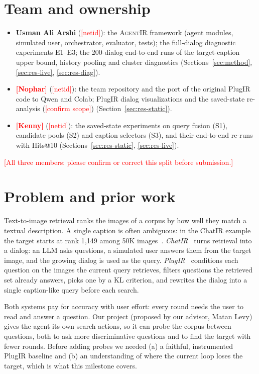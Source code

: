 \documentclass[sigconf,nonacm]{acmart}
\newcommand{\fillin}[1]{\textcolor{red}{[#1]}}
\begin{document}
\section{Team and ownership}
\label{sec:team}
\begin{itemize}
\item \textbf{Usman Ali Arshi} (\fillin{netid}): the \textsc{AgentIR} framework (agent modules,
  simulated user, orchestrator, evaluator, tests); the full-dialog diagnostic experiments E1--E3;
  the 200-dialog end-to-end runs of the target-caption upper bound, history pooling and cluster
  diagnostics (Sections~\ref{sec:method}, \ref{sec:res-live}, \ref{sec:res-diag}).
\item \textbf{\fillin{Nophar}} (\fillin{netid}): the team repository and the port of the original
  PlugIR code to Qwen and Colab; PlugIR dialog visualizations and the saved-state re-analysis
  (\fillin{confirm scope}) (Section~\ref{sec:res-static}).
\item \textbf{\fillin{Kenny}} (\fillin{netid}): the saved-state experiments on query fusion (S1),
  candidate pools (S2) and caption selectors (S3), and their end-to-end re-runs with Hits@10
  (Sections~\ref{sec:res-static}, \ref{sec:res-live}).
\end{itemize}
\fillin{All three members: please confirm or correct this split before submission.}

\section{Problem and prior work}
Text-to-image retrieval ranks the images of a corpus by how well they match a textual
description. A single caption is often ambiguous: in the ChatIR example the target starts at
rank 1{,}149 among 50K images~\cite{levy2023chatir}. \emph{ChatIR}~\cite{levy2023chatir}
turns retrieval into a dialog: an LLM asks questions, a simulated user answers them from the
target image, and the growing dialog is used as the query. \emph{PlugIR}~\cite{lee2024plugir}
conditions each question on the images the current query retrieves, filters questions the
retrieved set already answers, picks one by a KL criterion, and rewrites the dialog into a
single caption-like query before each search.

Both systems pay for accuracy with user effort: every round needs the user to read and answer a
question. Our project (proposed by our advisor, Matan Levy) gives the agent its own search
actions, so it can probe the corpus between questions, both to ask more discriminative questions
and to find the target with fewer rounds. Before adding probes we needed (a) a faithful,
instrumented PlugIR baseline and (b) an understanding of where the current loop loses the
target, which is what this milestone covers.
\end{document}
